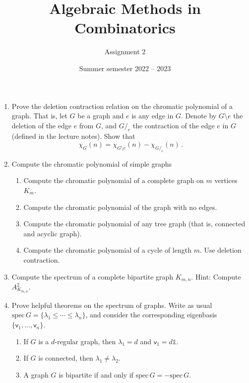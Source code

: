 \documentclass[kulak]{tplt}
\title{Algebraic Methods in Combinatorics}
\author{Assignment 2}
\date{Summer semester 2022 -- 2023}
\theoremstyle{definition}
\newcommand{\vv}{\mathsf{v}}
\newcommand{\spec}{\mathrm{spec}}
\begin{document}
\maketitle
\begin{enumerate}
\item Prove the deletion contraction relation on the chromatic polynomial of a graph.
That is, let $G$ be a graph and $e$ is any edge in $G$.
Denote by $G\setminus e $ the deletion of the edge $e$ from $G$, and $G /_e$ the contraction of the edge $e$ in $G$ (defined in the lecture notes).
Show that
$$ \chi_G(n) = \chi_{G\setminus e}(n) - \chi_{G /_e}(n)\, . $$

\item Compute the chromatic polynomial of simple graphs

\begin{enumerate}
\item Compute the chromatic polynomial of a complete graph on $m$ vertices $K_m$.

\item Compute the chromatic polynomial of the graph with no edges.

\item Compute the chromatic polynomial of any tree graph (that is, connected and acyclic graph).

\item Compute the chromatic polynomial of a cycle of length $m$.
Use deletion contraction.
\end{enumerate}



\item Compute the spectrum of a complete bipartite graph $K_{m, n}$.
Hint: Compute $A_{K_{m, n}}^2$.



\item Prove helpful theorems on the spectrum of graphs.
Write as usual $\spec \, G = \{\lambda_1 \leq \cdots \leq \lambda_n \}$, and consider the corresponding eigenbasis $\{\vv_1, \ldots, \vv_n\}$.


\begin{enumerate}
\item If $G$ is a $d$-regular graph, then $\lambda_1 = d$ and $\vv_1 = d\mathbb{1}$.

\item If $G$ is connected, then $\lambda_1 \neq \lambda_2$.

\item A graph $G$ is bipartite if and only if $\spec \, G = - \spec \, G$.


\end{enumerate}
\end{enumerate}
\end{document}
